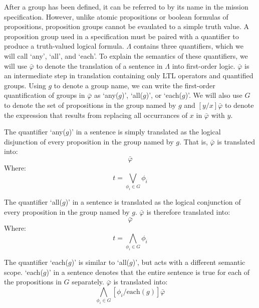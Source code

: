 After a group has been defined, it can be referred to by its name in the mission specification. 
However, unlike atomic propositions or boolean formulas of propositions, proposition groups cannot be evaulated to a simple truth value. 
A proposition group used in a specification must be paired with a quantifier to produce a truth-valued logical formula. 
$\Lambda$ contains three quantifiers, which we will call `any', `all', and `each'. 
To explain the semantics of these quantifiers, we will use $\bar{\varphi}$ to denote the translation of a sentence in $\Lambda$ into first-order logic. 
$\bar{\varphi}$ is an intermediate step in translation containing only LTL operators and quantified groups. Using $g$ to denote a group name, we can write the first-order quantification of groups in $\bar{\varphi}$ as `any($g$)', `all($g$)', or `each($g$)'. 
We will also use $G$ to denote the set of propositions in the group named by $g$ and $[y/x]\bar{\varphi}$ to denote the expression that results from replacing all occurrances of $x$ in $\bar{\varphi}$ with $y$. 
\par
The quantifier `any($g$)' in a sentence is simply translated as the logical disjunction of every proposition in the group named by $g$. 
That is, $\bar{\varphi}$ is translated into: 
\begin{equation*}
	[ t / \text{any}(g)] \bar{\varphi}
\end{equation*}
Where: 
\begin{equation*}
	t = \bigvee \limits_{\phi_i \in G} \phi_i
\end{equation*}
\par
The quantifier `all($g$)' in a sentence is translated as the logical conjunction of every proposition in the group named by $g$. 
$\bar{\varphi}$ is therefore translated into: 
\begin{equation*}
	[ t / \text{all}(g)] \bar{\varphi}
\end{equation*}
Where:
\begin{equation*}
	t = \bigwedge \limits_{\phi_i \in G} \phi_i
\end{equation*}
\par
The quantifier `each($g$)' is similar to `all($g$)', but acts with a different semantic scope. 
`each($g$)' in a sentence denotes that the entire sentence is true for each of the propositions in $G$ separately. 
$\bar{\varphi}$ is translated into:
\begin{equation*}
 	\bigwedge\limits_{\phi_i \in G} [\phi_i / \text{each}(g)] \bar{\varphi}
\end{equation*}
